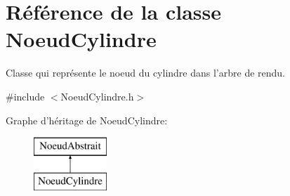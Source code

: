 \hypertarget{class_noeud_cylindre}{\section{Référence de la classe Noeud\-Cylindre}
\label{class_noeud_cylindre}
}


Classe qui représente le noeud du cylindre dans l'arbre de rendu.  




{\ttfamily \#include $<$Noeud\-Cylindre.\-h$>$}

Graphe d'héritage de Noeud\-Cylindre\-:\begin{figure}[H]
\begin{center}
\leavevmode
\includegraphics[height=2.000000cm]{class_noeud_cylindre}
\end{center}
\end{figure}
